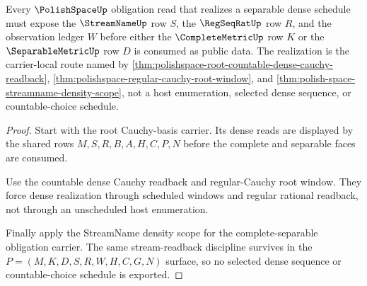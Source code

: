 \begin{theorem}
\label{thm:polishspace-stream-realization-obligation}
Every $\PolishSpaceUp$ obligation read that realizes a separable dense schedule must expose the $\StreamNameUp$ row $S$, the $\RegSeqRatUp$ row $R$, and the observation ledger $W$ before either the $\CompleteMetricUp$ row $K$ or the $\SeparableMetricUp$ row $D$ is consumed as public data. The realization is the carrier-local route named by \autoref{thm:polishspace-root-countable-dense-cauchy-readback}, \autoref{thm:polishspace-regular-cauchy-root-window}, and \autoref{thm:polish-space-streamname-density-scope}, not a host enumeration, selected dense sequence, or countable-choice schedule.
\end{theorem}
\begin{proof}
Start with the root Cauchy-basis carrier. Its dense reads are displayed by the shared rows $M,S,R,B,A,H,C,P,N$ before the complete and separable faces are consumed.

Use the countable dense Cauchy readback and regular-Cauchy root window. They force dense realization through scheduled windows and regular rational readback, not through an unscheduled host enumeration.

Finally apply the StreamName density scope for the complete-separable obligation carrier. The same stream-readback discipline survives in the $P=(M,K,D,S,R,W,H,C,G,N)$ surface, so no selected dense sequence or countable-choice schedule is exported.
\end{proof}

